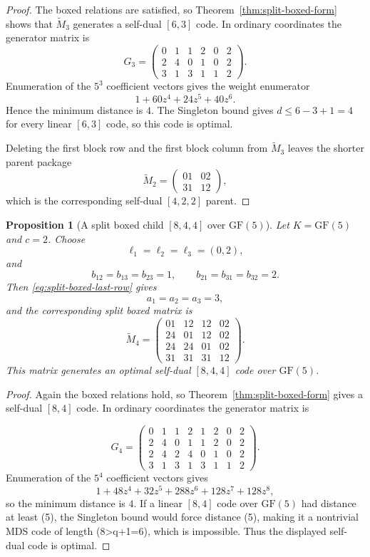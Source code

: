 \documentclass[12pt]{article}
\newtheorem{prop}[theorem]{Proposition}
\newcommand{\GF}[1]{\ensuremath{\mathrm{GF}(#1)}}
\begin{document}
\begin{proof}
The boxed relations are satisfied, so Theorem~\ref{thm:split-boxed-form} shows that \(\widetilde M_3\) generates a self-dual \([6,3]\) code. In ordinary coordinates the generator matrix is
\[
G_3=
\left(
\begin{array}{cc|cc|cc}
0&1&1&2&0&2\\
\hline
2&4&0&1&0&2\\
\hline
3&1&3&1&1&2
\end{array}
\right).
\]
Enumeration of the \(5^3\) coefficient vectors gives the weight enumerator
\[
1+60z^4+24z^5+40z^6.
\]
Hence the minimum distance is \(4\).  The Singleton bound gives
\(d\le6-3+1=4\) for every linear \([6,3]\) code, so this code is optimal.

Deleting the first block row and the first block column from \(\widetilde M_3\) leaves the shorter parent package
\[
\widetilde M_2=
\begin{pmatrix}
01 & 02\\
31 & 12
\end{pmatrix},
\]
which is the corresponding self-dual \([4,2,2]\) parent.
\end{proof}

\begin{prop}[A split boxed child \texorpdfstring{$[8,4,4]$}{[8,4,4]} over \texorpdfstring{$\GF{5}$}{GF(5)}]
\label{ex:split-boxed-84}
\rm
Let \(K=\GF{5}\) and \(c=2\). Choose
\[
\ell_1=\ell_2=\ell_3=(0,2),
\]
and
\[
b_{12}=b_{13}=b_{23}=1,\qquad
b_{21}=b_{31}=b_{32}=2.
\]
Then \eqref{eq:split-boxed-last-row} gives
\[
a_1=a_2=a_3=3,
\]
and the corresponding split boxed matrix is
\[
\widetilde M_4=
\begin{pmatrix}
01 & 12 & 12 & 02\\
24 & 01 & 12 & 02\\
24 & 24 & 01 & 02\\
31 & 31 & 31 & 12
\end{pmatrix}.
\]
This matrix generates an optimal self-dual \([8,4,4]\) code over \(\GF{5}\).
\end{prop}

\begin{proof}
Again the boxed relations hold, so Theorem~\ref{thm:split-boxed-form} gives a self-dual \([8,4]\) code. In ordinary coordinates the generator matrix is

\[
G_4= \left(
\begin{array}{cc|cccc|cc}
0&1&1&2&1&2&0&2\\
2&4&0&1&1&2&0&2\\
2&4&2&4&0&1&0&2\\
\hline
3&1&3&1&3&1&1&2
\end{array}
\right).
\]
Enumeration of the \(5^4\) coefficient vectors gives
\[
1+48z^4+32z^5+288z^6+128z^7+128z^8,
\]
so the minimum distance is \(4\).  If a linear \([8,4]\) code over
\(\GF{5}\) had distance at least (5), the Singleton bound would force
distance (5), making it a nontrivial MDS code of length (8>q+1=6),
which is impossible.  Thus the displayed self-dual code is optimal.
\end{proof}
\end{document}
